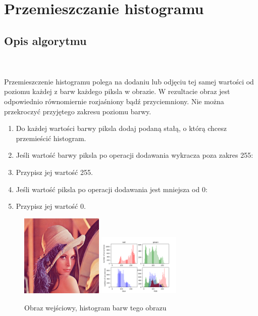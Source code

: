 \documentclass[final,a4paper,openany,12pt]{mwbk}
\begin{document}
\pagebreak


\section{Przemieszczanie histogramu}
\subsection*{Opis algorytmu}
\hfill
\\\\
\indent Przemieszczenie histogramu polega na dodaniu lub odjęciu tej samej wartości od poziomu każdej z barw każdego piksla w obrazie.
W rezultacie obraz jest odpowiednio równomiernie rozjaśniony bądź przyciemniony.
Nie można przekroczyć przyjętego zakresu poziomu barwy.
\begin{enumerate}
	\item Do każdej wartości barwy piksla dodaj podaną stałą, o którą chcesz przemieścić histogram.
	\item Jeśli wartość barwy piksla po operacji dodawania wykracza poza zakres 255:
	\item Przypisz jej wartość 255.
	\item Jeśli wartość piksla po operacji dodawania jest mniejsza od 0:
	\item Przypisz jej wartość 0.
\end{enumerate}

\begin{figure}[H]
	\begin{center}
		\includegraphics[width=0.35\textwidth]{lena_color}
		\includegraphics[width=0.35\textwidth]{lena_color_histogram}
	\end{center}
	\caption{Obraz wejściowy, histogram barw tego obrazu}
\end{figure}
\end{document}
